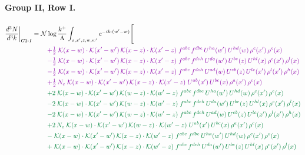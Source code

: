 \documentclass[10pt]{article}
\numberwithin{equation}{section}
\newcommand{\NN}{\mathcal N\log\frac{k^+}{\Lambda}}
\begin{document}
\paragraph{Group II, Row I.}
\begin{align}
\frac{d^3N}{d^3k}\bigg|_{G2\text{-}I}={}&\NN\int_{x,x',z,w,w'}e^{-ik\cdot(w'-w)}\Bigg[\notag\\
&\quad{\color{CC}+\tfrac{1}{2}\;\mathcal{K}(x-w)\cdot\mathcal{K}(x'-w')\,\mathcal{K}(x-z)\cdot\mathcal{K}(x'-z)\;f^{abc}\,f^{dbe}\,U^{ha}(w')\,U^{hd}(w)\,\rho^{c}(x')\,\rho^{e}(x)}\notag\\
&\quad{\color{CC}-\tfrac{1}{2}\;\mathcal{K}(x-w)\cdot\mathcal{K}(x'-w')\,\mathcal{K}(x-z)\cdot\mathcal{K}(x'-z)\;f^{abc}\,f^{deh}\,U^{da}(w')\,U^{be}(z)\,U^{hl}(x)\,\rho^{c}(x')\,\rho^{l}(x)}\notag\\
&\quad{\color{CC}-\tfrac{1}{2}\;\mathcal{K}(x-w)\cdot\mathcal{K}(x'-w')\,\mathcal{K}(x-z)\cdot\mathcal{K}(x'-z)\;f^{abc}\,f^{deh}\,U^{ad}(w)\,U^{eb}(z)\,U^{lc}(x')\,\rho^{l}(x')\,\rho^{h}(x)}\notag\\
&\quad{\color{CC}+\tfrac{1}{2}\,N_c\;\mathcal{K}(x-w)\cdot\mathcal{K}(x'-w')\,\mathcal{K}(x-z)\cdot\mathcal{K}(x'-z)\;U^{ab}(x')\,U^{bc}(x)\,\rho^{a}(x')\,\rho^{c}(x)}\notag\\
&\quad{\color{JIM}+2\;\mathcal{K}(x-w)\cdot\mathcal{K}(x'-w')\,\mathcal{K}(w-z)\cdot\mathcal{K}(w'-z)\;f^{abc}\,f^{dbe}\,U^{ha}(w')\,U^{hd}(w)\,\rho^{c}(x')\,\rho^{e}(x)}\notag\\
&\quad{\color{JIM}-2\;\mathcal{K}(x-w)\cdot\mathcal{K}(x'-w')\,\mathcal{K}(w-z)\cdot\mathcal{K}(w'-z)\;f^{abc}\,f^{deh}\,U^{da}(w')\,U^{be}(z)\,U^{hl}(x)\,\rho^{c}(x')\,\rho^{l}(x)}\notag\\
&\quad{\color{JIM}-2\;\mathcal{K}(x-w)\cdot\mathcal{K}(x'-w')\,\mathcal{K}(w-z)\cdot\mathcal{K}(w'-z)\;f^{abc}\,f^{deh}\,U^{ad}(w)\,U^{eb}(z)\,U^{lc}(x')\,\rho^{l}(x')\,\rho^{h}(x)}\notag\\
&\quad{\color{JIM}+2\,N_c\;\mathcal{K}(x-w)\cdot\mathcal{K}(x'-w')\,\mathcal{K}(w-z)\cdot\mathcal{K}(w'-z)\;U^{ab}(x')\,U^{bc}(x)\,\rho^{a}(x')\,\rho^{c}(x)}\notag\\
&\quad{\color{JIM}-\;\mathcal{K}(x-w)\cdot\mathcal{K}(x'-w')\,\mathcal{K}(x-z)\cdot\mathcal{K}(w'-z)\;f^{abc}\,f^{dbe}\,U^{ha}(w')\,U^{hd}(w)\,\rho^{c}(x')\,\rho^{e}(x)}\notag\\
&\quad{\color{JIM}+\;\mathcal{K}(x-w)\cdot\mathcal{K}(x'-w')\,\mathcal{K}(x-z)\cdot\mathcal{K}(w'-z)\;f^{abc}\,f^{deh}\,U^{da}(w')\,U^{be}(z)\,U^{hl}(x)\,\rho^{c}(x')\,\rho^{l}(x)}\notag\\

\end{align}
\end{document}
